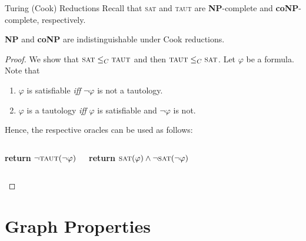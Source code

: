 \documentclass[10pt,aspectratio=169,english]{beamer}
\begin{document}
\begin{frame}{Turing (Cook) Reductions}
Recall that \textsc{sat} and \textsc{taut} are \textbf{NP}-complete and \textbf{coNP}-complete, respectively.
\begin{theorem}
\textbf{NP} and \textbf{coNP} are indistinguishable under Cook reductions.
\end{theorem}
\begin{proof}[Proof\nopunct]
We show that $\textsc{sat} \leq_C \textsc{taut}$ and then $\textsc{taut} \leq_C \textsc{sat}$. Let $\varphi$ be a formula. Note that
\begin{enumerate}
	\item $\varphi$ is satisfiable \textit{iff} $\neg \varphi$ is not a tautology.
	
	\item $\varphi$ is a tautology \textit{iff} $\varphi$ is satisfiable and $\neg\varphi$ is not.
\end{enumerate}
Hence, the respective oracles can be used as follows:
\begin{columns}[T,onlytextwidth]
\begin{algorithmic}[1]
            \State \textbf{return} $\neg \textsc{taut}(\neg \varphi)$
        \EndProcedure
    \end{algorithmic}
	\begin{algorithmic}[1]
            \State \textbf{return} $\textsc{sat}(\varphi) \land \neg \textsc{sat}(\neg \varphi)$
        \EndProcedure {\qedhere\text{\,\,}}
    \end{algorithmic}
    \end{columns}
\end{proof}
\end{frame}




\section{Graph Properties}
\end{document}
